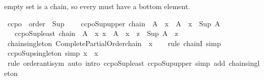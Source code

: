 \begin{isabellebody}
\begin{isamarkuptext}
  empty set is a chain, so every  must have a bottom element.%
\end{isamarkuptext}\isamarkuptrue%
\isamarkupfalse%
\ ccpo\ {\isacharequal}{\kern0pt}\ order\ {\isacharplus}{\kern0pt}\ Sup\ {\isacharplus}{\kern0pt}\isanewline
\ \ \ ccpo{\isacharunderscore}{\kern0pt}Sup{\isacharunderscore}{\kern0pt}upper{\isacharcolon}{\kern0pt}\ {\isachardoublequoteopen}chain\ {\isacharparenleft}{\kern0pt}{\isasymle}{\isacharparenright}{\kern0pt}\ A\ {\isasymLongrightarrow}\ x\ {\isasymin}\ A\ {\isasymLongrightarrow}\ x\ {\isasymle}\ Sup\ A{\isachardoublequoteclose}\isanewline
\ \ \ ccpo{\isacharunderscore}{\kern0pt}Sup{\isacharunderscore}{\kern0pt}least{\isacharcolon}{\kern0pt}\ {\isachardoublequoteopen}chain\ {\isacharparenleft}{\kern0pt}{\isasymle}{\isacharparenright}{\kern0pt}\ A\ {\isasymLongrightarrow}\ {\isacharparenleft}{\kern0pt}{\isasymAnd}x{\isachardot}{\kern0pt}\ x\ {\isasymin}\ A\ {\isasymLongrightarrow}\ x\ {\isasymle}\ z{\isacharparenright}{\kern0pt}\ {\isasymLongrightarrow}\ Sup\ A\ {\isasymle}\ z{\isachardoublequoteclose}\isanewline
{}\isanewline
\isanewline
{}\isamarkupfalse%
\ chain{\isacharunderscore}{\kern0pt}singleton{\isacharcolon}{\kern0pt}\ {\isachardoublequoteopen}Complete{\isacharunderscore}{\kern0pt}Partial{\isacharunderscore}{\kern0pt}Order{\isachardot}{\kern0pt}chain\ {\isacharparenleft}{\kern0pt}{\isasymle}{\isacharparenright}{\kern0pt}\ {\isacharbraceleft}{\kern0pt}x{\isacharbraceright}{\kern0pt}{\isachardoublequoteclose}\isanewline
%
\isadelimproof
\ \ %
\endisadelimproof
%
\isatagproof
{}\isamarkupfalse%
\ {\isacharparenleft}{\kern0pt}rule\ chainI{\isacharparenright}{\kern0pt}\ simp%
\endisatagproof
{\isafoldproof}%
%
\isadelimproof
\isanewline
%
\endisadelimproof
\isanewline
{}\isamarkupfalse%
\ ccpo{\isacharunderscore}{\kern0pt}Sup{\isacharunderscore}{\kern0pt}singleton\ {\isacharbrackleft}{\kern0pt}simp{\isacharbrackright}{\kern0pt}{\isacharcolon}{\kern0pt}\ {\isachardoublequoteopen}{\isasymSqunion}{\isacharbraceleft}{\kern0pt}x{\isacharbraceright}{\kern0pt}\ {\isacharequal}{\kern0pt}\ x{\isachardoublequoteclose}\isanewline
%
\isadelimproof
\ \ %
\endisadelimproof
%
\isatagproof
{}\isamarkupfalse%
\ {\isacharparenleft}{\kern0pt}rule\ order{\isachardot}{\kern0pt}antisym{\isacharparenright}{\kern0pt}\ {\isacharparenleft}{\kern0pt}auto\ intro{\isacharcolon}{\kern0pt}\ ccpo{\isacharunderscore}{\kern0pt}Sup{\isacharunderscore}{\kern0pt}least\ ccpo{\isacharunderscore}{\kern0pt}Sup{\isacharunderscore}{\kern0pt}upper\ simp\ add{\isacharcolon}{\kern0pt}\ chain{\isacharunderscore}{\kern0pt}singleton{\isacharparenright}{\kern0pt}%

\end{isabellebody}
